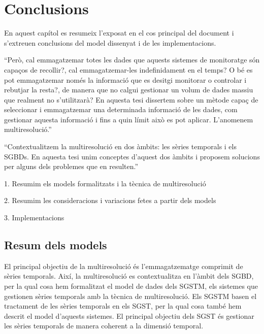 \chapter{Conclusions}
\label{sec:conclusions}



En aquest capítol es resumeix l'exposat en el cos principal del
document i s'extreuen conclusions del model dissenyat i de les
implementacions.


``Però, cal emmagatzemar totes les dades que aquests sistemes de
monitoratge són capaços de recollir?, cal emmagatzemar-les
indefinidament en el temps? O bé es pot emmagatzemar només la
informació que es desitgi monitorar o controlar i rebutjar la resta?,
de manera que no calgui gestionar un volum de dades massiu que
realment no s'utilitzarà? En aquesta tesi dissertem sobre un mètode
capaç de seleccionar i emmagatzemar una determinada informació de les
dades, com gestionar aquesta informació i fins a quin límit això es pot
aplicar. L'anomenem multiresolució.''

``Contextualitzem la multiresolució en dos àmbits: les sèries temporals
i els \glspl{SGBD}. En aquesta tesi unim conceptes d'aquest dos àmbits
i proposem solucions per alguns dels problemes que en resulten.''



1. Resumim els models formalitzats i la tècnica de multiresolució

2. Resumim les consideracions i variacions fetes a partir dels models

3. Implementacions










\section{Resum dels models}


El principal objectiu de la multiresolució és l'emmagatzematge
comprimit de sèries temporals. Així, la multiresolució es
contextualitza en l'àmbit dels \gls{SGBD}, per la qual cosa hem
formalitzat el model de dades dels \gls{SGSTM}, els sistemes que
gestionen sèries temporals amb la tècnica de multiresolució. Els
\gls{SGSTM} basen el tractament de les sèries temporals en els
\gls{SGST}, per la qual cosa també hem descrit el model d'aquests
sistemes. El principal objectiu dels \gls{SGST} és gestionar les
sèries temporals de manera coherent a la dimensió temporal.



